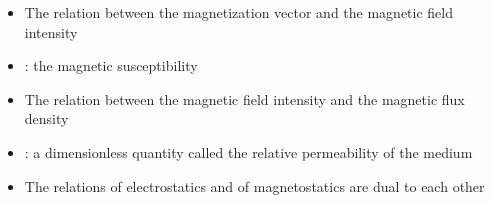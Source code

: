 \ELhold


\begin{ELjoin}

\begin{itemize}
\tightlist
\item
  The relation between the magnetization vector and the magnetic field intensity
\end{itemize}


\begin{itemize}
\tightlist
\item
  : the magnetic susceptibility
\item
  The relation between the magnetic field intensity and the magnetic flux density
\end{itemize}

\begin{ELimportant}{}


\end{ELimportant}

\end{ELjoin}

\begin{ELunit}


\begin{itemize}
\tightlist
\item
  : a dimensionless quantity called the relative permeability of the medium
\item
  The relations of electrostatics and of magnetostatics are dual to each other
\end{itemize}

\end{ELunit}

